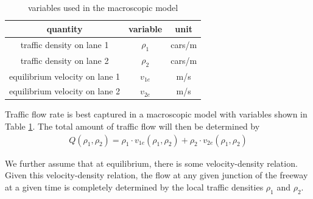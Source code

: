 \begin{table}[h]
	\begin{tabular}{|c|c|c|} \hline
	quantity & variable & unit \\ \hline
	traffic density on lane 1 & $\rho_1$ & cars/m \\ \hline
	traffic density on lane 2 & $\rho_2$ & cars/m \\ \hline
	equilibrium velocity on lane 1 & $v_{1e}$ & m/s \\ \hline
	equilibrium velocity on lane 2 & $v_{2e}$ & m/s \\ \hline
	\end{tabular}
	\caption{ variables used in the macroscopic model \label{tab:variables} }
	\end{table}	 
	Traffic flow rate is best captured in a macroscopic model with variables shown in Table \ref{tab:variables}. The total amount of traffic flow will then be determined by
	\begin{align}
	& Q(\rho_1,\rho_2) = \rho_1\cdot v_{1e}(\rho_1,\rho_2)+\rho_2\cdot v_{2e}(\rho_1,\rho_2) & \label{eq:flow}
	\end{align}
	
	We further assume that at equilibrium, there is some velocity-density relation. Given this velocity-density relation, the flow at any given junction of the freeway at a given time is completely determined by the local traffic densities $\rho_1$ and $\rho_2$.
	

	
